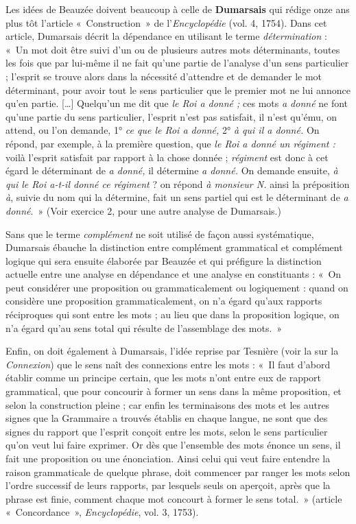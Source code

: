 {    Les idées de Beauzée doivent beaucoup à celle de \textbf{Dumarsais} qui rédige onze ans plus tôt l’article «~Construction~» de l’\textit{Encyclopédie} (vol. 4, 1754). Dans cet article, Dumarsais décrit la dépendance en utilisant le terme \textit{détermination} : «~Un mot doit être suivi d’un ou de plusieurs autres mots déterminants, toutes les fois que par lui-même il ne fait qu’une partie de l’analyse d’un sens particulier ; l’esprit se trouve alors dans la nécessité d’attendre et de demander le mot déterminant, pour avoir tout le sens particulier que le premier mot ne lui annonce qu’en partie. […] Quelqu’un me dit que \textit{le Roi a donné ;} ces mots \textit{a donné} ne font qu’une partie du sens particulier, l’esprit n’est pas satisfait, il n’est qu’ému, on attend, ou l’on demande, 1° \textit{ce que le Roi a donné,} 2° \textit{à qui il a donné.} On répond, par exemple, à la première question, que \textit{le Roi a donné un régiment :} voilà l’esprit satisfait par rapport à la chose donnée ; \textit{régiment} est donc à cet égard le déterminant de \textit{a donné,} il détermine \textit{a donné.} On demande ensuite, \textit{à qui le Roi a-t-il donné ce régiment} ? on répond \textit{à monsieur N.} ainsi la préposition \textit{à}, suivie du nom qui la détermine, fait un sens partiel qui est le déterminant de \textit{a donné}.~» (Voir exercice 2,  pour une autre analyse de Dumarsais.)

    Sans que le terme \textit{complément} ne soit utilisé de façon aussi systématique, Dumarsais ébauche la distinction entre complément grammatical et complément logique qui sera ensuite élaborée par Beauzée et qui préfigure la distinction actuelle entre une analyse en dépendance et une analyse en constituants : «~On peut considérer une proposition ou grammaticalement ou logiquement : quand on considère une proposition grammaticalement, on n’a égard qu’aux rapports réciproques qui sont entre les mots ; au lieu que dans la proposition logique, on n’a égard qu’au sens total qui résulte de l’assemblage des mots.~»

    Enfin, on doit également à Dumarsais, l’idée reprise par Tesnière (voir la  sur la \textit{Connexion}) que le sens naît des connexions entre les mots : «~Il faut d’abord établir comme un principe certain, que les mots n’ont entre eux de rapport grammatical, que pour concourir à former un sens dans la même proposition, et selon la construction pleine ; car enfin les terminaisons des mots et les autres signes que la Grammaire a trouvés établis en chaque langue, ne sont que des signes du rapport que l’esprit conçoit entre les mots, selon le sens particulier qu’on veut lui faire exprimer. Or dès que l’ensemble des mots énonce un sens, il fait une proposition ou une énonciation. Ainsi celui qui veut faire entendre la raison grammaticale de quelque phrase, doit commencer par ranger les mots selon l’ordre successif de leurs rapports, par lesquels seuls on aperçoit, après que la phrase est finie, comment chaque mot concourt à former le sens total.~» (article «~Concordance~», \textit{Encyclopédie}, vol. 3, 1753).

}
